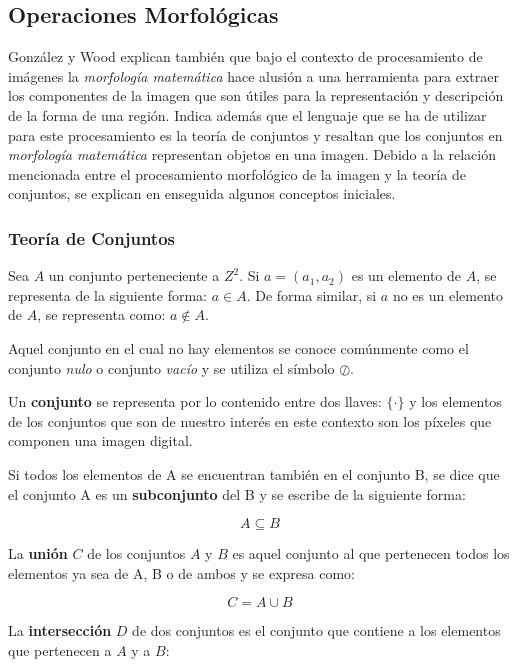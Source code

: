 \subsection{Operaciones Morfológicas}

González y Wood explican también que bajo el contexto de procesamiento de imágenes la \textit{morfología matemática} hace alusión a una herramienta para extraer los componentes de la imagen que son útiles para la representación y descripción de la forma de una región. Indica además que el lenguaje que se ha de utilizar para este procesamiento es la teoría de conjuntos y resaltan que los conjuntos en \textit{morfología matemática} representan objetos en una imagen.
Debido a la relación mencionada entre el procesamiento morfológico de la imagen y la teoría de conjuntos, se explican en enseguida algunos conceptos iniciales.

\subsubsection{Teoría de Conjuntos}
Sea $A$ un conjunto perteneciente a $Z^2$. Si $a = (a_{1}, a_{2})$ es un elemento de $A$, se representa de la siguiente forma: $a \in A$. De forma similar, si $a$ no es un elemento de $A$, se representa como: $a\notin A$.

Aquel conjunto en el cual no hay elementos se conoce comúnmente como el conjunto \textit{nulo} o conjunto \textit{vacío} y se utiliza el símbolo $\oslash$.

Un \textbf{conjunto} se representa por lo contenido entre dos llaves: $\{\cdot\}$ y los elementos de los conjuntos que son de nuestro interés en este contexto son los píxeles que componen una imagen digital.

Si todos los elementos de A se encuentran también en el conjunto B, se dice que el conjunto A es un \textbf{subconjunto} del B y se escribe de la siguiente forma:

\begin{equation*}
A\subseteq B
\end{equation*}

La \textbf{unión} $C$ de los conjuntos $A$ y $B$ es aquel conjunto al que pertenecen todos los elementos ya sea de A, B o de ambos y se expresa como:

\begin{equation*}
C = A \cup B
\end{equation*}

La \textbf{intersección} $D$ de dos conjuntos es el conjunto que contiene a los elementos que pertenecen a $A$ y a $B$:

